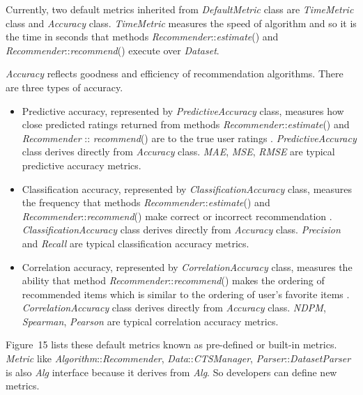 \documentclass[a4paper]{llncs}
\begin{document}
Currently, two default metrics inherited from \textit{DefaultMetric} class are \textit{TimeMetric} class and \textit{Accuracy} class. \textit{TimeMetric} measures the speed of algorithm and so it is the time in seconds that methods \textit{Recommender}::\textit{estimate}() and \textit{Recommender}::\textit{recommend}() execute over \textit{Dataset}.

\textit{Accuracy} reflects goodness and efficiency of recommendation algorithms. There are three types of accuracy.
\begin{itemize}
\item Predictive accuracy, represented by \textit{PredictiveAccuracy} class, measures how close predicted ratings returned from methods \textit{Recommender}::\textit{estimate}() and \textit{Recommender} :: \textit{recommend}() are to the true user ratings \cite[pp. 20-21]{herlocker2004}. \textit{PredictiveAccuracy} class derives directly from \textit{Accuracy} class. \textit{MAE}, \textit{MSE}, \textit{RMSE} \cite[pp. 20-21]{herlocker2004} are typical predictive accuracy metrics.
\item Classification accuracy, represented by \textit{ClassificationAccuracy} class, measures the frequency that methods \textit{Recommender}::\textit{estimate}() and \textit{Recommender}::\textit{recommend}() make correct or incorrect recommendation \cite[pp. 20-22]{herlocker2004}. \textit{ClassificationAccuracy} class derives directly from \textit{Accuracy} class. \textit{Precision} and \textit{Recall} \cite[pp. 22-25]{herlocker2004} are typical classification accuracy metrics.
\item Correlation accuracy, represented by \textit{CorrelationAccuracy} class, measures the ability that method \textit{Recommender}::\textit{recommend}() makes the ordering of recommended items which is similar to the ordering of user's favorite items \cite[pp. 29-33]{herlocker2004}. \textit{CorrelationAccuracy} class derives directly from \textit{Accuracy} class. \textit{NDPM}, \textit{Spearman}, \textit{Pearson} \cite[pp. 29-33]{herlocker2004} are typical correlation accuracy metrics.
\end{itemize}
Figure~15 lists these default metrics known as pre-defined or built-in metrics. \textit{Metric} like \textit{Algorithm}::\textit{Recommender}, \textit{Data}::\textit{CTSManager}, \textit{Parser}::\textit{DatasetParser} is also \textit{Alg} interface because it derives from \textit{Alg}. So developers can define new metrics.
\end{document}

